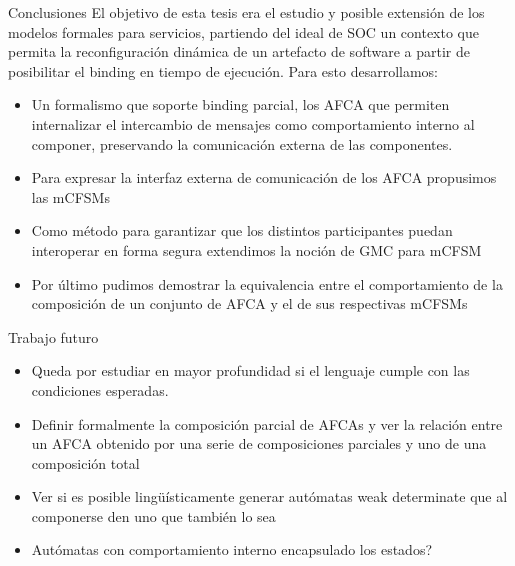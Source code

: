 \documentclass[10pt,xcolor={table,dvipsnames},t]{beamer}
\begin{document}
\begin{frame}{Conclusiones}
 \vspace{\fill}
El objetivo de esta tesis era el estudio y posible extensión de los modelos formales para servicios, partiendo del ideal de SOC un contexto que permita la reconfiguración dinámica de un artefacto de software a partir de posibilitar el binding en tiempo de ejecución. Para esto desarrollamos:
\begin{itemize}
    \item Un formalismo que soporte binding parcial, los AFCA que permiten internalizar el intercambio de mensajes como comportamiento interno al componer, preservando la comunicación externa de las componentes.
    \item Para expresar la interfaz externa de comunicación de los AFCA propusimos las mCFSMs
    \item Como método para garantizar que los distintos participantes puedan interoperar en forma segura extendimos la noción de GMC para mCFSM
    \item Por último pudimos demostrar la equivalencia entre el comportamiento de la composición de un conjunto de AFCA y el de sus respectivas mCFSMs
\end{itemize}
 \vspace{\fill}
\end{frame}

\begin{frame}{Trabajo futuro}
 \vspace{\fill}
\begin{itemize}
    \item Queda por estudiar en mayor profundidad si el lenguaje cumple con las condiciones esperadas.
    \item Definir formalmente la composición parcial de AFCAs y ver la relación entre un AFCA obtenido por una serie de composiciones parciales y uno de una composición total
    \item Ver si es posible lingüísticamente generar autómatas weak determinate que al componerse den uno que también lo sea
    \item Autómatas con comportamiento interno encapsulado los estados?
\end{itemize}
 \vspace{\fill}
\end{frame}
\end{document}
